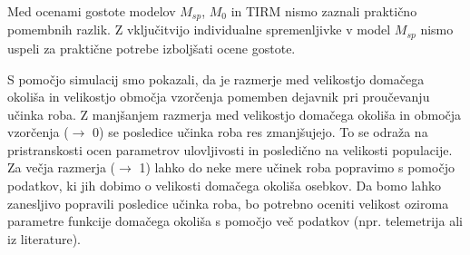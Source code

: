 Med ocenami gostote modelov $M_{sp}$, $M_0$ in TIRM nismo zaznali praktično pomembnih razlik. Z vključitvijo individualne spremenljivke v model $M_{sp}$ nismo uspeli za praktične potrebe izboljšati ocene gostote.

S pomočjo simulacij smo pokazali, da je razmerje med velikostjo domačega okoliša in velikostjo območja vzorčenja pomemben dejavnik pri proučevanju učinka roba. Z manjšanjem razmerja med velikostjo domačega okoliša in območja vzorčenja ($\rightarrow$ 0) se posledice učinka roba res zmanjšujejo. To se odraža na pristranskosti ocen parametrov ulovljivosti in posledično na velikosti populacije. Za večja razmerja ($\rightarrow$ 1) lahko do neke mere učinek roba popravimo s pomočjo podatkov, ki jih dobimo o velikosti domačega okoliša osebkov. Da bomo lahko zanesljivo popravili posledice učinka roba, bo potrebno oceniti velikost oziroma parametre funkcije domačega okoliša s pomočjo več podatkov (npr. telemetrija ali iz literature).
